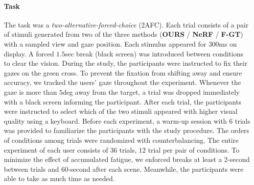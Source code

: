 \paragraph{Task}
The task was a \textit{two-alternative-forced-choice} (2AFC). Each trial consists of a pair of stimuli generated from two of the three methods ({\bf OURS} / {\bf NeRF} / {\bf F-GT}) with a sampled view and gaze position. Each stimulus appeared for $300$ms on display. A forced $1.5$sec break (black screen) was introduced between conditions to clear the vision. During the study, the participants were instructed to fix their gazes on the green cross. To prevent the fixation from shifting away and ensure accuracy, we tracked the users' gaze throughout the experiment. Whenever the gaze is more than $5$deg away from the target, a trial was dropped immediately with a black screen informing the participant.
After each trial, the participants were instructed to select which of the two stimuli appeared with higher visual quality using a keyboard.
Before each experiment, a warm-up session with 6 trials was provided to familiarize the participants with the study procedure. The orders of conditions among trials were randomized with counterbalancing. The entire experiment of each user consists of $36$ trials, $12$ trial per pair of conditions.
To minimize the effect of accumulated fatigue, we enforced breaks at least a 2-second between trials and 60-second after each scene. Meanwhile, the participants were able to take as much time as needed. 

